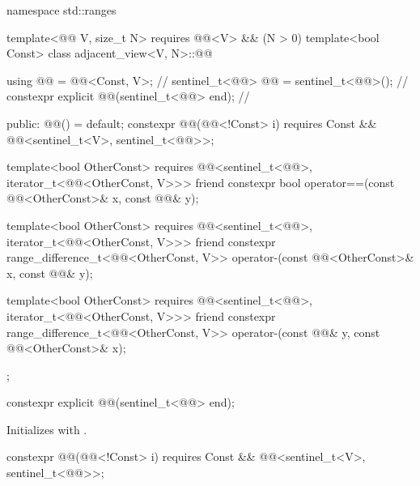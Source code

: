 %
\begin{codeblock}
namespace std::ranges {
  template<@@ V, size_t N>
    requires @@<V> && (N > 0)
  template<bool Const>
  class adjacent_view<V, N>::@@ {
    using @@ = @@<Const, V>;                         // \expos
    sentinel_t<@@> @@ = sentinel_t<@@>();                 // \expos
    constexpr explicit @@(sentinel_t<@@> end);          // \expos

  public:
    @@() = default;
    constexpr @@(@@<!Const> i)
      requires Const && @@<sentinel_t<V>, sentinel_t<@@>>;

    template<bool OtherConst>
      requires @@<sentinel_t<@@>, iterator_t<@@<OtherConst, V>>>
    friend constexpr bool operator==(const @@<OtherConst>& x, const @@& y);

    template<bool OtherConst>
      requires @@<sentinel_t<@@>, iterator_t<@@<OtherConst, V>>>
    friend constexpr range_difference_t<@@<OtherConst, V>>
      operator-(const @@<OtherConst>& x, const @@& y);

    template<bool OtherConst>
      requires @@<sentinel_t<@@>, iterator_t<@@<OtherConst, V>>>
    friend constexpr range_difference_t<@@<OtherConst, V>>
      operator-(const @@& y, const @@<OtherConst>& x);
  };
}
\end{codeblock}

%
\begin{itemdecl}
constexpr explicit @@(sentinel_t<@@> end);
\end{itemdecl}

\begin{itemdescr}
\pnum
\effects
Initializes  with .
\end{itemdescr}

%
\begin{itemdecl}
constexpr @@(@@<!Const> i)
  requires Const && @@<sentinel_t<V>, sentinel_t<@@>>;
\end{itemdecl}

